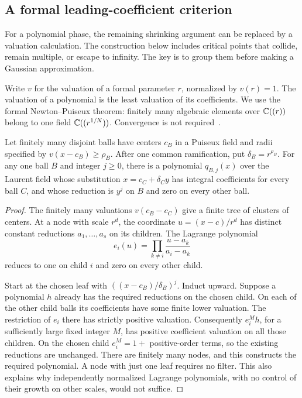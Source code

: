 \subsection{A formal leading-coefficient criterion}\label{sec:stationaryballs}

For a polynomial phase, the remaining shrinking argument can be
replaced by a valuation calculation. The construction below includes
critical points that collide, remain multiple, or escape to infinity.
The key is to group them before making a Gaussian approximation.

Write $v$ for the valuation of a formal parameter $r$, normalized by
$v(r)=1$. The valuation of a polynomial is the least valuation of its
coefficients. We use the formal Newton--Puiseux theorem: finitely many
algebraic elements over $\mathbb C((r))$ belong to one field
$\mathbb C((r^{1/N}))$. Convergence is not required~\cite[Chapter~2]{Wall}.

\begin{lemma}\label{lem:ballseparation}
Let finitely many disjoint balls have centers $c_B$ in a Puiseux field
and radii specified by $v(x-c_B)\geq\rho_B$. After one common
ramification, put $\delta_B=r^{\rho_B}$. For any one ball $B$ and
integer $j\geq0$, there is a polynomial $q_{B,j}(x)$ over the Laurent
field whose substitution $x=c_C+\delta_C y$ has integral coefficients
for every ball $C$, and whose reduction is $y^j$ on $B$ and zero on
every other ball.
\end{lemma}
\begin{proof}
The finitely many valuations $v(c_B-c_C)$ give a finite tree of
clusters of centers. At a node with scale $r^d$, the coordinate
$u=(x-c)/r^d$ has distinct constant reductions $a_1,\ldots,a_s$
on its children. The Lagrange polynomial
\[
 e_i(u)=\prod_{k\ne i}\frac{u-a_k}{a_i-a_k}
\]
reduces to one on child $i$ and zero on every other child.

Start at the chosen leaf with $((x-c_B)/\delta_B)^j$. Induct upward.
Suppose a polynomial $h$ already has the required reductions on the
chosen child. On each of the other child balls its coefficients have
some finite lower valuation. The restriction of $e_i$ there has
strictly positive valuation. Consequently $e_i^M h$, for a sufficiently
large fixed integer $M$, has positive coefficient valuation on all
those children. On the chosen child $e_i^M=1+$ positive-order terms,
so the existing reductions are unchanged. There are finitely many
nodes, and this constructs the required polynomial. A node with just
one leaf requires no filter. This also explains why independently
normalized Lagrange polynomials, with no control of their growth on
other scales, would not suffice.
\end{proof}

